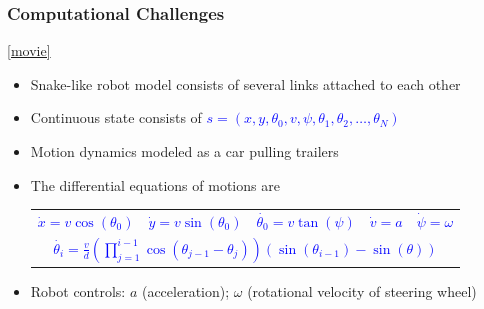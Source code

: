 \documentclass[10pt,t]{beamer}
\begin{document}
\begin{frame}
\frametitle{Computational Challenges}

\href{run:strailer3.wmv}{\footnotesize{[movie]}}

\begin{itemize}
\item Snake-like robot model consists of several links attached to
  each other
\item[] Continuous state consists of
\textcolor{blue}{
$
s = (x, y, \theta_0, v, \psi, \theta_1, \theta_2, \ldots, \theta_N)
$}

\vspace*{1mm}

\item Motion dynamics modeled as a car pulling trailers

\item[] The differential
    equations of motions are
\textcolor{blue}{
\begin{tabular}{lllll}
$\dot{x} = v \cos(\theta_0)$  & 
$\dot{y} = v \sin(\theta_0)$ &
$\dot{\theta_0} = v\tan(\psi)$ &
$\dot{v} = a$  & 
$\dot{\psi} = \omega$  \\
\multicolumn{5}{c}{$\dot{\theta_i} = \frac{v}{d} \left(\prod_{j=1}^{i-1}\cos(\theta_{j-1}
- \theta_j)\right) (\sin(\theta_{i-1}) - \sin(\theta))$} 
\end{tabular}}

\vspace*{1mm}

\item[] Robot controls: \textcolor{mathrgb}{$a$} (acceleration); \hspace{2mm}
  \textcolor{mathrgb}{$\omega$} (rotational velocity  of steering wheel)

\end{itemize}

\end{frame}
\end{document}
